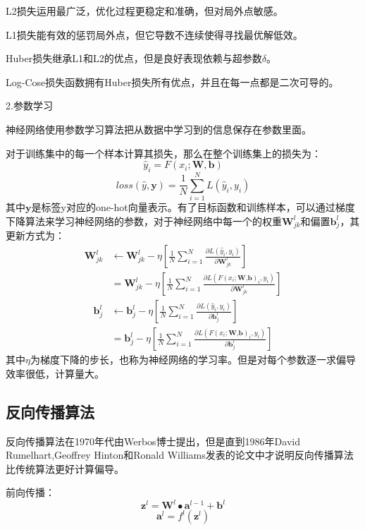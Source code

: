 \documentclass[openbib]{article}
\begin{document}
L2损失运用最广泛，优化过程更稳定和准确，但对局外点敏感。

L1损失能有效的惩罚局外点，但它导数不连续使得寻找最优解低效。

Huber损失继承L1和L2的优点，但是良好表现依赖与超参数$\delta$。

Log-Cose损失函数拥有Huber损失所有优点，并且在每一点都是二次可导的。

\begin{center}
	2.参数学习
\end{center}

神经网络使用参数学习算法把从数据中学习到的信息保存在参数里面。

对于训练集中的每一个样本计算其损失，那么在整个训练集上的损失为：
$$\hat{y}_i=F(x_i;\textbf{W},\textbf{b})$$
$$loss(\hat{y},\textbf{y})=\frac{1}{N}\sum_{i=1}^{N}L(\hat{y}_i,y_i)$$
其中$\textbf{y}$是标签y对应的one-hot向量表示。有了目标函数和训练样本，可以通过梯度下降算法来学习神经网络的参数，对于神经网络中每一个的权重$\textbf{W}_{jk}^l$和偏置$\textbf{b}_j^l$，其更新方式为：
\begin{equation*}
	\begin{aligned}
	\textbf{W}_{jk}^l&\gets  \textbf{W}_{jk}^l-\eta[\frac{1}{N}\sum_{i=1}^{N}\frac{\partial L(\hat{y}_i,y_i)}{\partial \textbf{W}_{jk}^l}]\\
	&=\textbf{W}_{jk}^l-\eta[\frac{1}{N}\sum_{i=1}^{N}\frac{\partial L(F(x_i;\textbf{W,b})_i,y_i)}{\partial \textbf{W}_{jk}^l}]
	\end{aligned}
\end{equation*}
\begin{equation*}
	\begin{aligned}
		\textbf{b}_{j}^l&\gets  \textbf{b}_{j}^l-\eta[\frac{1}{N}\sum_{i=1}^{N}\frac{\partial L(\hat{y}_i,y_i)}{\partial \textbf{b}_{j}^l}]\\
		&=\textbf{b}_{j}^l-\eta[\frac{1}{N}\sum_{i=1}^{N}\frac{\partial L(F(x_i;\textbf{W,b})_i,y_i)}{\partial \textbf{b}_{j}^l}]
	\end{aligned}
\end{equation*}
其中$\eta$为梯度下降的步长，也称为神经网络的学习率。但是对每个参数逐一求偏导效率很低，计算量大。
\subsection{反向传播算法}
反向传播算法在1970年代由Werbos博士提出，但是直到1986年David Rumelhart,Geoffrey Hinton和Ronald Williams发表的论文中才说明反向传播算法比传统算法更好计算偏导。

前向传播：
$$\textbf{z}^l=\textbf{W}^l\bullet \textbf{a}^{l-1}+\textbf{b}^l$$
$$\textbf{a}^l=f^l(\textbf{z}^l)$$
\end{document}
